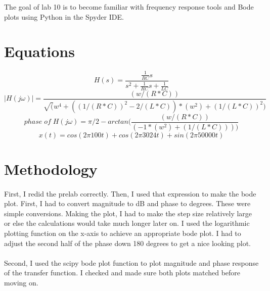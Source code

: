 \documentclass[12pt]{report}
\begin{document}
The goal of lab 10 is to become familiar with frequency response tools and Bode plots using Python in the Spyder IDE.

\section{Equations}
    \begin{equation}
        H(s) = \frac{\frac{1}{RC}s}{s^2+\frac{1}{RC}s+\frac{1}{LC}} 
    \end{equation}
    \begin{equation}
        |H(j\omega)| = \frac{(w/(R*C))}{\sqrt(w^4 + ((1/(R*C))^2 - 2/(L*C))*(w^2) + (1/(L*C))^2)}  
    \end{equation}
    \begin{equation}
        phase \; of \; H(j\omega) = \pi/2 - arctan(\frac{(w/(R*C))}{(-1*(w^2)+(1/(L*C))))} 
    \end{equation}
    \begin{equation}
        x(t) = cos(2\pi 100t) + cos(2\pi 3024t) + sin(2\pi 50000t)
    \end{equation}
    
\section{Methodology}


    \paragraph{} First, I redid the prelab correctly. Then, I used that expression to make the bode plot. First, I had to convert magnitude to dB and phase to degrees. These were simple conversions. Making the plot, I had to make the step size relatively large or else the calculations would take much longer later on. I used the logarithmic plotting function on the x-axis to achieve an appropriate bode plot. I had to adjust the second half of the phase down 180 degrees to get a nice looking plot. 
    
    \paragraph{} Second, I used the scipy bode plot function to plot magnitude and phase response of the transfer function. I checked and made sure both plots matched before moving on. 
    
\end{document}
